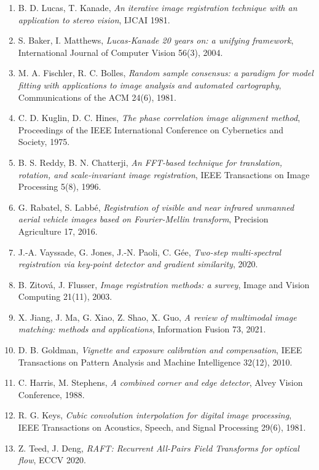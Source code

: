\documentclass[a4paper,11pt]{report}
\begin{document}
{\begin{enumerate}
	\item\label{ann_lucas} B. D. Lucas, T. Kanade, \emph{An iterative image registration technique with an application to stereo vision}, IJCAI 1981.
	\item\label{ann_baker} S. Baker, I. Matthews, \emph{Lucas-Kanade 20 years on: a unifying framework}, International Journal of Computer Vision 56(3), 2004.
	\item\label{ann_ransac} M. A. Fischler, R. C. Bolles, \emph{Random sample consensus: a paradigm for model fitting with applications to image analysis and automated cartography}, Communications of the ACM 24(6), 1981.
	\item\label{ann_kuglin} C. D. Kuglin, D. C. Hines, \emph{The phase correlation image alignment method}, Proceedings of the IEEE International Conference on Cybernetics and Society, 1975.
	\item\label{ann_reddy} B. S. Reddy, B. N. Chatterji, \emph{An FFT-based technique for translation, rotation, and scale-invariant image registration}, IEEE Transactions on Image Processing 5(8), 1996.
	\item\label{ann_rabatel} G. Rabatel, S. Labbé, \emph{Registration of visible and near infrared unmanned aerial vehicle images based on Fourier-Mellin transform}, Precision Agriculture 17, 2016.
	\item\label{ann_vayssade} J.-A. Vayssade, G. Jones, J.-N. Paoli, C. Gée, \emph{Two-step multi-spectral registration via key-point detector and gradient similarity}, 2020.
	\item\label{ann_zitova} B. Zitová, J. Flusser, \emph{Image registration methods: a survey}, Image and Vision Computing 21(11), 2003.
	\item\label{ann_jiang} X. Jiang, J. Ma, G. Xiao, Z. Shao, X. Guo, \emph{A review of multimodal image matching: methods and applications}, Information Fusion 73, 2021.
	\item\label{ann_goldman} D. B. Goldman, \emph{Vignette and exposure calibration and compensation}, IEEE Transactions on Pattern Analysis and Machine Intelligence 32(12), 2010.
	\item\label{ann_harris} C. Harris, M. Stephens, \emph{A combined corner and edge detector}, Alvey Vision Conference, 1988.
	\item\label{ann_keys} R. G. Keys, \emph{Cubic convolution interpolation for digital image processing}, IEEE Transactions on Acoustics, Speech, and Signal Processing 29(6), 1981.
	\item\label{ann_raft} Z. Teed, J. Deng, \emph{RAFT: Recurrent All-Pairs Field Transforms for optical flow}, ECCV 2020.
\end{enumerate}}
\end{document}
